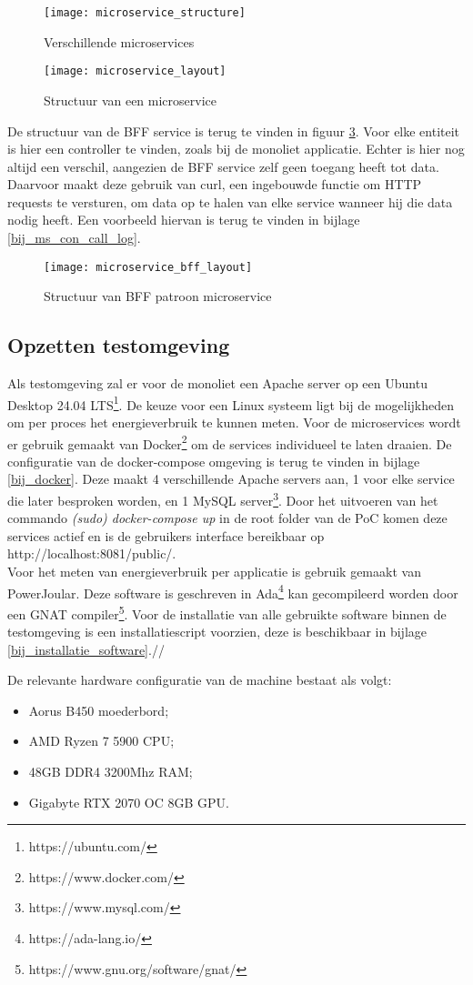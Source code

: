 \begin{figure}[h!]
    \texttt{[image: microservice\_structure]}
    \caption{Verschillende microservices}
    \label{multiple_microservices}
\end{figure}

\begin{figure}[h!]
    \texttt{[image: microservice\_layout]}
    \caption{Structuur van een microservice}
    \label{microservice_layout}
\end{figure}

De structuur van de BFF service is terug te vinden in figuur \ref{microservice_bff_layout}. Voor elke entiteit is hier een controller te vinden, zoals bij de monoliet applicatie. Echter is hier nog altijd een verschil, aangezien de BFF service zelf geen toegang heeft tot data. Daarvoor maakt deze gebruik van curl, een ingebouwde functie om HTTP requests te versturen, om data op te halen van elke service wanneer hij die data nodig heeft. Een voorbeeld hiervan is terug te vinden in bijlage \ref{bij_ms_con_call_log}.\\

\begin{figure}[h!]
    \texttt{[image: microservice\_bff\_layout]}
    \caption{Structuur van BFF patroon microservice}
    \label{microservice_bff_layout}
\end{figure}

\subsection{Opzetten testomgeving}
Als testomgeving zal er voor de monoliet een Apache server op een Ubuntu Desktop 24.04 LTS\footnote{https://ubuntu.com/}. De keuze voor een Linux systeem ligt bij de mogelijkheden om per proces het energieverbruik te kunnen meten. Voor de microservices wordt er gebruik gemaakt van Docker\footnote{https://www.docker.com/} om de services individueel te laten draaien. De configuratie van de docker-compose omgeving is terug te vinden in bijlage \ref{bij_docker}. Deze maakt 4 verschillende Apache servers aan, 1 voor elke service die later besproken worden, en 1 MySQL server\footnote{https://www.mysql.com/}. Door het uitvoeren van het commando \textit{(sudo) docker-compose up} in de root folder van de PoC komen deze services actief en is de gebruikers interface bereikbaar op http://localhost:8081/public/.\\

Voor het meten van energieverbruik per applicatie is gebruik gemaakt van PowerJoular. Deze software is geschreven in Ada\footnote{https://ada-lang.io/} kan gecompileerd worden door een GNAT compiler\footnote{https://www.gnu.org/software/gnat/}. Voor de installatie van alle gebruikte software binnen de testomgeving is een installatiescript voorzien, deze is beschikbaar in bijlage \ref{bij_installatie_software}.// %

De relevante hardware configuratie van de machine bestaat als volgt:
\begin{itemize}
    \item Aorus B450 moederbord;
    \item AMD Ryzen 7 5900 CPU;
    \item 48GB DDR4 3200Mhz RAM;
    \item Gigabyte RTX 2070 OC 8GB GPU.
\end{itemize}